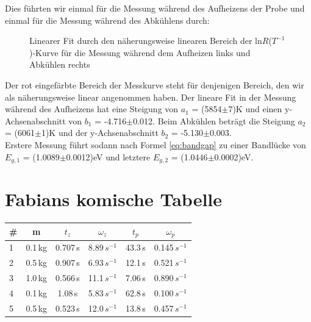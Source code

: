 \documentclass[a4paper]{scrartcl}
\begin{document}
Dies führten wir einmal für die Messung während des Aufheizens der Probe und einmal für die Messung während des Abkühlens durch:
\\
\begin{figure}[H]
\centering
\caption{Linearer Fit durch den näherungsweise linearen Bereich der ln$R$($T^{-1}$)-Kurve für die Messung während dem Aufheizen links und Abkühlen rechts}
\end{figure}

Der rot eingefärbte Bereich der Messkurve steht für denjenigen Bereich, den wir als näherungsweise linear angenommen haben. Der lineare Fit in der Messung während des Aufheizens hat eine Steigung von $a_1$ = (5854$\pm$7)K und einen y-Achsenabschnitt von $b_1$ = -4.716$\pm$0.012. Beim Abkühlen beträgt die Steigung  $a_2$ = (6061$\pm$1)K und der y-Achsenabschnitt $b_2$ = -5.130$\pm$0.003.
\\
Erstere Messung führt sodann nach Formel \ref{eq:bandgap} zu einer Bandlücke von $E_{g,1}$ = (1.0089$\pm$0.0012)eV und letztere $E_{g,2}$ = (1.0446$\pm$0.0002)eV.





\section{Fabians komische Tabelle}

\begin{tabular}{lccccc}
	\hline
	\# & m & $t_{z}$ & $\omega_{z}$ & $t_{p}$ & $\omega_{p}$ \\
	\hline
	1 & 0.1\,kg & 0.707\,s & 8.89\,$s^{-1}$ & 43.3\,s & 0.145\,$s^{-1}$\\
	2 & 0.5\,kg & 0.907\,s & 6.93\,$s^{-1}$ & 12.1\,s & 0.521\,$s^{-1}$\\
	3 & 1.0\,kg & 0.566\,s & 11.1\,$s^{-1}$ & 7.06\,s & 0.890\,$s^{-1}$\\
	4 & 0.1\,kg & 1.08\,s & 5.83\,$s^{-1}$ & 62.8\,s & 0.100\,$s^{-1}$\\
	5 & 0.5\,kg & 0.523\,s & 12.0\,$s^{-1}$ & 13.8\,s & 0.457\,$s^{-1}$\\
\end{tabular}\\
\end{document}
